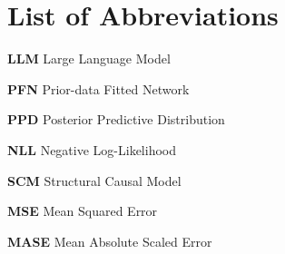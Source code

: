 \chapter*{List of Abbreviations}
\textbf{LLM} Large Language Model

\textbf{PFN} Prior-data Fitted Network

\textbf{PPD} Posterior Predictive Distribution

\textbf{NLL} Negative Log-Likelihood

\textbf{SCM} Structural Causal Model

\textbf{MSE} Mean Squared Error

\textbf{MASE} Mean Absolute Scaled Error